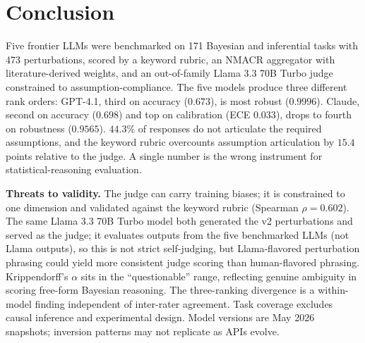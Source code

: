 
\section{Conclusion}
\label{sec:conclusion}

Five frontier LLMs were benchmarked on 171 Bayesian and inferential
tasks with 473 perturbations, scored by a keyword rubric, an NMACR
aggregator with literature-derived weights, and an out-of-family
Llama 3.3 70B Turbo judge constrained to assumption-compliance. The
five models produce three different rank orders: GPT-4.1, third on
accuracy ($0.673$), is most robust ($0.9996$). Claude, second on
accuracy ($0.698$) and top on calibration (ECE $0.033$), drops to
fourth on robustness ($0.9565$).
$44.3\%$ of responses do not articulate the required assumptions,
and the keyword rubric overcounts assumption articulation by
$15.4$ points relative to the judge. A single number is the wrong
instrument for statistical-reasoning evaluation.

\textbf{Threats to validity.} The judge can carry training biases;
it is constrained to one dimension and validated against the keyword
rubric (Spearman $\rho = 0.602$). The same Llama 3.3 70B Turbo
model both generated the v2 perturbations and served as the judge;
it evaluates outputs from the five benchmarked LLMs (not Llama
outputs), so this is not strict self-judging, but Llama-flavored
perturbation phrasing could yield more consistent judge scoring
than human-flavored phrasing. Krippendorff's $\alpha$ sits in the
``questionable'' range, reflecting genuine ambiguity in scoring
free-form Bayesian reasoning. The three-ranking divergence is a
within-model finding independent of inter-rater agreement. Task
coverage excludes causal inference and experimental design. Model
versions are May 2026 snapshots; inversion patterns may not
replicate as APIs evolve.

